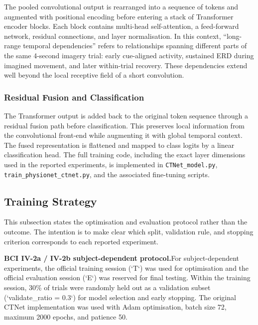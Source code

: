 \documentclass[12pt, a4paper]{article}
\begin{document}
The pooled convolutional output is rearranged into a sequence of tokens and augmented with positional encoding before entering a stack of Transformer encoder blocks. Each block contains multi-head self-attention, a feed-forward network, residual connections, and layer normalisation. In this context, ``long-range temporal dependencies'' refers to relationships spanning different parts of the same 4-second imagery trial: early cue-aligned activity, sustained ERD during imagined movement, and later within-trial recovery. These dependencies extend well beyond the local receptive field of a short convolution.

\subsubsection{Residual Fusion and Classification}

The Transformer output is added back to the original token sequence through a residual fusion path before classification. This preserves local information from the convolutional front-end while augmenting it with global temporal context. The fused representation is flattened and mapped to class logits by a linear classification head. The full training code, including the exact layer dimensions used in the reported experiments, is implemented in \texttt{CTNet\_model.py}, \texttt{train\_physionet\_ctnet.py}, and the associated fine-tuning scripts.

\subsection{Training Strategy}

This subsection states the optimisation and evaluation protocol rather than the outcome. The intention is to make clear which split, validation rule, and stopping criterion corresponds to each reported experiment.

\textbf{BCI IV-2a / IV-2b subject-dependent protocol.}\quad For subject-dependent experiments, the official training session (`T`) was used for optimisation and the official evaluation session (`E`) was reserved for final testing. Within the training session, 30\% of trials were randomly held out as a validation subset (`validate\_ratio = 0.3`) for model selection and early stopping. The original CTNet implementation was used with Adam optimisation, batch size 72, maximum 2000 epochs, and patience 50.
\end{document}
